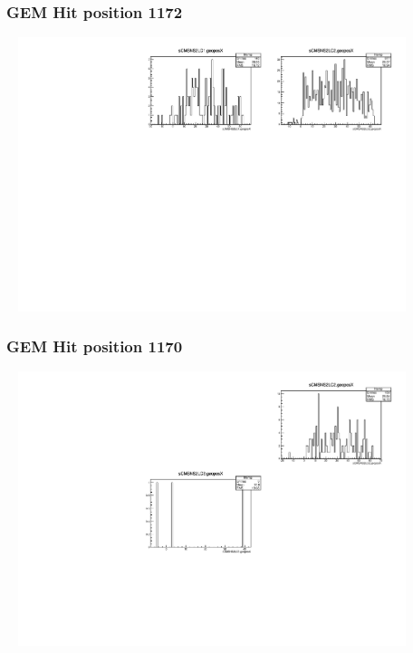 \documentclass[slidestop,compress,mathserif]{beamer}
\begin{document}
\begin{frame}\frametitle{GEM Hit position 1172}
	 \includegraphics[width=12cm,height=8cm]{GEM_Hit_position_1172.pdf}
\end{frame}
\begin{frame}\frametitle{GEM Hit position 1170}
	 \includegraphics[width=12cm,height=8cm]{GEM_Hit_position_1170.pdf}
\end{frame}
\end{document}
